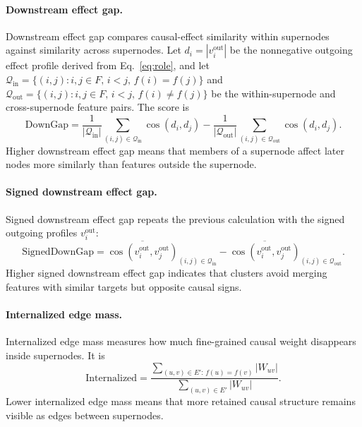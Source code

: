 \documentclass[../main.tex]{subfiles}
\begin{document}
\paragraph{Downstream effect gap.}
Downstream effect gap compares causal-effect similarity within supernodes against
similarity across supernodes. Let $d_i = |v_i^{\text{out}}|$ be the nonnegative
outgoing effect profile derived from Eq.~\eqref{eq:role}, and let
$\mathcal{Q}_{\text{in}}=\{(i,j): i,j\in F,\, i<j,\, f(i)=f(j)\}$ and
$\mathcal{Q}_{\text{out}}=\{(i,j): i,j\in F,\, i<j,\, f(i)\ne f(j)\}$ be the
within-supernode and cross-supernode feature pairs. The score is
\begin{equation}
\mathrm{DownGap}
=
\frac{1}{|\mathcal{Q}_{\text{in}}|}
  \sum_{(i,j)\in\mathcal{Q}_{\text{in}}}\cos(d_i,d_j)
-
\frac{1}{|\mathcal{Q}_{\text{out}}|}
  \sum_{(i,j)\in\mathcal{Q}_{\text{out}}}\cos(d_i,d_j).
\label{eq:metric-downgap}
\end{equation}
Higher downstream effect gap means that members of a supernode affect later nodes
more similarly than features outside the supernode.

\paragraph{Signed downstream effect gap.}
Signed downstream effect gap repeats the previous calculation with the signed
outgoing profiles $v_i^{\text{out}}$:
\begin{equation}
\mathrm{SignedDownGap}
=
\overline{\cos(v_i^{\text{out}},v_j^{\text{out}})}_{(i,j)\in\mathcal{Q}_{\text{in}}}
-
\overline{\cos(v_i^{\text{out}},v_j^{\text{out}})}_{(i,j)\in\mathcal{Q}_{\text{out}}}.
\label{eq:metric-signed-downgap}
\end{equation}
Higher signed downstream effect gap indicates that clusters avoid merging
features with similar targets but opposite causal signs.

\paragraph{Internalized edge mass.}
Internalized edge mass measures how much fine-grained causal weight disappears
inside supernodes. It is
\begin{equation}
\mathrm{Internalized}
=
\frac{\sum_{(u,v)\in E':\, f(u)=f(v)} |W_{uv}|}
     {\sum_{(u,v)\in E'} |W_{uv}|}.
\label{eq:metric-internalized}
\end{equation}
Lower internalized edge mass means that more retained causal structure remains
visible as edges between supernodes.
\end{document}
